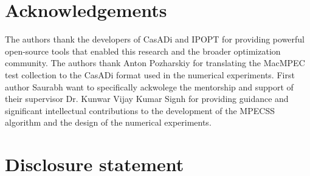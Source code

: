 \documentclass[]{interact}
\theoremstyle{plain}
\theoremstyle{definition}
\theoremstyle{remark}
\begin{document}













\section*{Acknowledgements}

The authors thank the developers of CasADi and IPOPT for providing powerful open-source tools that enabled this research and the broader optimization community. The authors thank Anton Pozharskiy for translating the MacMPEC test collection to the CasADi format used in the numerical experiments. First author Saurabh want to specifically ackwolege the mentorship and support of their supervisor Dr. Kunwar Vijay Kumar Signh for providing guidance and significant intellectual contributions to the development of the MPECSS algorithm and the design of the numerical experiments.


\section*{Disclosure statement}
\end{document}

